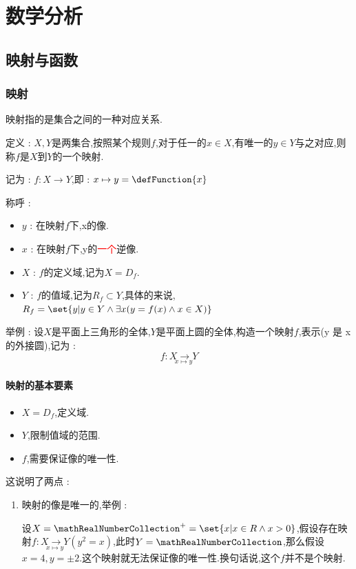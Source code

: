 \chapter{数学分析}{
\section{映射与函数}{

\subsection{映射}{
    映射指的是集合之间的一种对应关系.

    定义 : $X,Y$是两集合,按照某个规则$f$,对于任一的$x \in X$,有唯一的$y \in Y$与之对应,则称$f$是$X$到$Y$的一个映射.

    记为 : $f: X \to Y$,即 : $x \mapsto y = \defFunction{x}$

    称呼 :

    \begin{itemize}
        \item $y$ : 在映射$f$下,x的像.
        \item $x$ : 在映射$f$下,y的\textcolor{red}{一个}逆像.
        \item $X$ : $f$的定义域,记为$X = D_f$.
        \item $Y$ : $f$的值域,记为$R_f \subset Y$,具体的来说,$R_f = \set{y | y \in Y \land \exists x(y = f(x) \land x \in X)}$
    \end{itemize}

    举例 : 设$X$是平面上三角形的全体,$Y$是平面上圆的全体,构造一个映射$f$,表示(y 是 x 的外接圆),记为 : $$
        f : \underset{x \mapsto y}{X \to Y}
    $$

    \subsubsection{映射的基本要素}{
        \begin{itemize}
            \item $X = D_f$,定义域.
            \item $Y$,限制值域的范围.
            \item $f$,需要保证像的唯一性.
        \end{itemize}

        这说明了两点 : \begin{enumerate}
            \item {
                  映射的像是唯一的,举例 :

                  设$X = \mathRealNumberCollection^+ = \set{x | x \in R \land x > 0}$,假设存在映射$f : \underset{x \mapsto y}{X \to Y}(y^2 = x)$,此时$Y = \mathRealNumberCollection$,那么假设$x = 4,y = \pm 2$.这个映射就无法保证像的唯一性.换句话说,这个$f$并不是个映射.

}
\end{enumerate}}}}}
